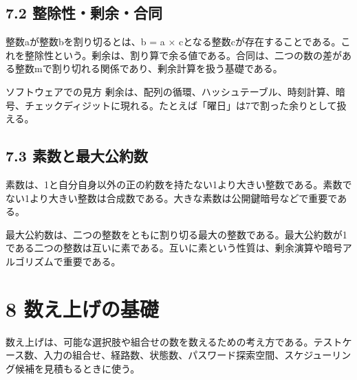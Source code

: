 \documentclass[uplatex,dvipdfmx,a4paper,10pt]{jsarticle}
\begin{document}
\subsection{7.2 整除性・剰余・合同}
整数aが整数bを割り切るとは、b = a × cとなる整数cが存在することである。これを整除性という。剰余は、割り算で余る値である。合同は、二つの数の差がある整数mで割り切れる関係であり、剰余計算を扱う基礎である。

\begin{infobox}{ソフトウェアでの見方}
剰余は、配列の循環、ハッシュテーブル、時刻計算、暗号、チェックディジットに現れる。たとえば「曜日」は7で割った余りとして扱える。
\end{infobox}
\subsection{7.3 素数と最大公約数}
素数は、1と自分自身以外の正の約数を持たない1より大きい整数である。素数でない1より大きい整数は合成数である。大きな素数は公開鍵暗号などで重要である。

最大公約数は、二つの整数をともに割り切る最大の整数である。最大公約数が1である二つの整数は互いに素である。互いに素という性質は、剰余演算や暗号アルゴリズムで重要である。

\section{8 数え上げの基礎}
数え上げは、可能な選択肢や組合せの数を数えるための考え方である。テストケース数、入力の組合せ、経路数、状態数、パスワード探索空間、スケジューリング候補を見積もるときに使う。
\end{document}
